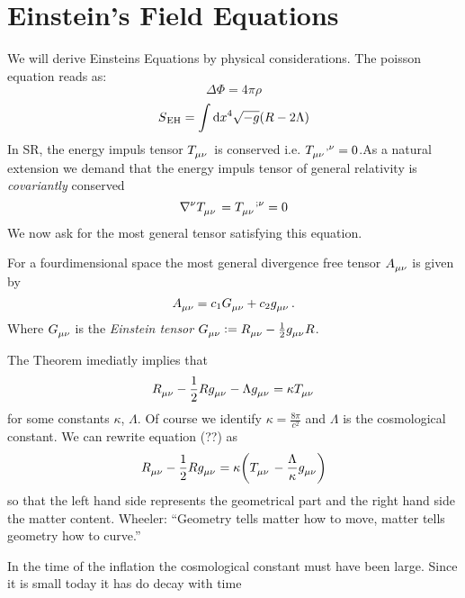 \chapter{Einstein's Field Equations}
We will derive Einsteins Equations by physical considerations. The poisson
equation reads as:
\begin{equation}
\Delta\Phi=4\pi\rho
\end{equation}
\begin{equation}
S\textsubscript{EH}=\int\dif x^4 \sqrt{-g}(R-2\Lambda)
\end{equation}
In SR, the energy impuls tensor $\tensor{T}{_\mu_\nu}$ is conserved i.e.
$\tensor{T}{_\mu_\nu^{,\nu}}=0$.As a natural extension we demand that the energy
impuls tensor of general relativity is \emph{covariantly} conserved
\begin{equation}
\tensor{\nabla}{^\nu}\tensor{T}{_\mu_\nu}=\tensor{T}{_\mu_\nu^{;\nu}}=0
\end{equation}
We now ask for the most general tensor satisfying this equation.
\begin{theorem}[Lovelock]
For a fourdimensional space the most general divergence free tensor
$\tensor{A}{_\mu_\nu}$ is given by
\begin{equation}
\tensor{A}{_\mu_\nu}= c_1\tensor{G}{_\mu_\nu}+c_2\tensor{g}{_\mu_\nu}\, .
\end{equation}
Where $\tensor{G}{_\mu_\nu}$ is the \emph{Einstein tensor}
$\tensor{G}{_\mu_\nu}:=\tensor{R}{_\mu_\nu}-\frac{1}{2}\tensor{g}{_\mu_\nu}R$.
\end{theorem}
The Theorem imediatly implies that
\begin{equation}
\tensor{R}{_\mu_\nu}-\frac{1}{2}R\tensor{g}{_\mu_\nu}-\Lambda\tensor{g}{_\mu_\nu}=\kappa\tensor{T}{_\mu_\nu}
\end{equation}
for some constants $\kappa$, $\Lambda$.
Of course we identify $\kappa=\frac{8\pi}{c^2}$ and $\Lambda$ is the
cosmological constant. We can rewrite equation (??) as
\begin{equation}
\tensor{R}{_\mu_\nu}-\frac{1}{2}R\tensor{g}{_\mu_\nu}
=\kappa\left(\tensor{T}{_\mu_\nu}-\frac{\Lambda}{\kappa}\tensor{g}{_\mu_\nu}\right)
\end{equation}
so that the left hand side represents the geometrical part and the right hand
side the matter content.
Wheeler: ``Geometry tells matter how to move, matter tells geometry how to
curve.''
\begin{sidenote}
In the time of the inflation the cosmological constant must have been large.
Since it is small today it has do decay with time
\end{sidenote}
